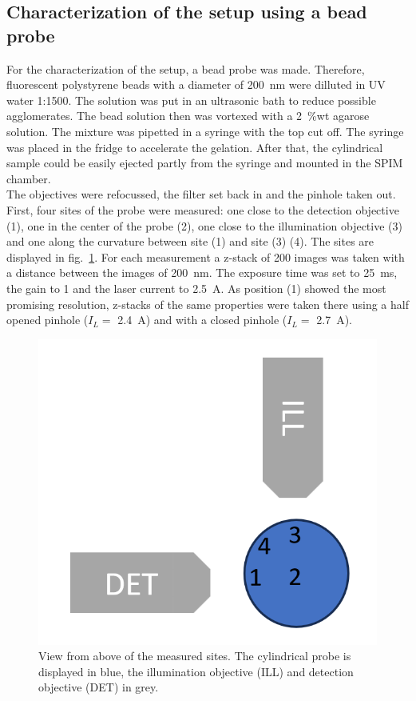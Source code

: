 \subsection*{Characterization of the setup using a bead probe}
For the characterization of the setup, a bead probe was made. Therefore, fluorescent polystyrene beads with a diameter of \SI{200}{\nano\meter} were dilluted in UV water 1:1500. The solution was put in an ultrasonic bath to reduce possible agglomerates. The bead solution then was vortexed with a \SI{2}{\percent}wt agarose solution. The mixture was pipetted in a syringe with the top cut off. The syringe was placed in the fridge to accelerate the gelation. After that, the cylindrical sample could be easily ejected partly from the syringe and mounted in the SPIM chamber.\\
The objectives were refocussed, the filter set back in and the pinhole taken out. First, four sites of the probe were measured: one close to the detection objective (1), one in the center of the probe (2), one close to the illumination objective (3) and one along the curvature between site (1) and site (3) (4). The sites are displayed in fig.~\ref{fig:sites}. For each measurement a z-stack of 200 images was taken with a distance between the images of \SI{200}{\nano\meter}. The exposure time was set to \SI{25}{\milli\second}, the gain to \num{1} and the laser current to \SI{2.5}{\ampere}. As position (1) showed the most promising resolution, z-stacks of the same properties were taken there using a half opened pinhole ($I_L=$ \SI{2.4}{\ampere}) and with a closed pinhole ($I_L=$ \SI{2.7}{\ampere}).

\begin{figure}[ht]
    \centering
    \includegraphics[width = .5\textwidth]{Bilder/Setup/sites.png}
    \caption{View from above of the measured sites. The cylindrical probe is displayed in blue, the illumination objective (ILL) and detection objective (DET) in grey.}
    \label{fig:sites}
\end{figure}

